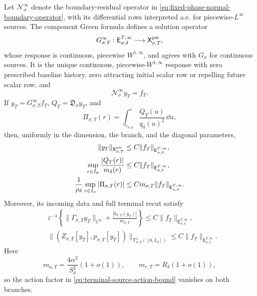 \begin{proposition}
Let \(\mathscr N_\sigma^\infty\) denote the boundary-residual operator in
\cref{eq:fixed-phase-normal-boundary-operator}, with its differential rows
interpreted a.e. for piecewise-\(L^\infty\) sources.  The component Green
formula defines a solution operator
\begin{equation}
 G_{\sigma,T}^{\infty}:
 \mathsf E_{\sigma,\delta}^{T,\infty}
 \longrightarrow\mathsf X_{\sigma,T}^{\rm pw},              \label{eq:terminal-source-green-extension}
\end{equation}
whose response is continuous, piecewise \(W^{1,\infty}\), and agrees with
\(G_\sigma\) for continuous sources.  It is the unique continuous,
piecewise-\(W^{1,\infty}\) response with zero prescribed baseline history,
zero attracting initial scalar row or repelling future scalar row, and
\begin{equation}
 \mathscr N_\sigma^\infty y_T=f_T.                         \label{eq:terminal-source-ae-normal-equation}
\end{equation}
If
\(
y_T=G_{\sigma,T}^{\infty}f_T
\),
\(
Q_T=\mathfrak D_\sigma y_T
\), and
\begin{equation}
 \Pi_{\sigma,T}(r)
 =\int_{e_{\sigma,0}}^r\frac{Q_T(u)}{q_0(u)^2}\,\dd u,       \label{eq:terminal-source-causal-primitive}
\end{equation}
then, uniformly in the dimension, the branch, and the diagonal parameters,
\begin{align}
 \|y_T\|_{\mathsf X_{\sigma,T}^{\rm pw}}
 &\le C\|f_T\|_{\mathsf E_{\sigma,\delta}^{T,\infty}},
                                                        \label{eq:terminal-source-state-bound}\\
 \sup_{r\in I_\sigma}\frac{|Q_T(r)|}{m_\delta(r)}
 &\le C\|f_T\|_{\mathsf E_{\sigma,\delta}^{T,\infty}},
                                                        \label{eq:terminal-source-speed-bound}\\
 \frac1{\rho_\delta}\sup_{r\in I_\sigma}|\Pi_{\sigma,T}(r)|
 &\le C m_{\sigma,T}
       \|f_T\|_{\mathsf E_{\sigma,\delta}^{T,\infty}}.     \label{eq:terminal-source-action-bound}
\end{align}
Moreover, its incoming data and full terminal recut satisfy
\begin{align}
 &\varepsilon^{-1}\left\{
   \|\Gamma_{\sigma,T}y_T\|_{C^0}
   +\frac{|b_{\sigma,T}(y_T)|}{m_{\sigma,T}}\right\}
 \le C\|f_T\|_{\mathsf E_{\sigma,\delta}^{T,\infty}},
                                                        \label{eq:terminal-source-interface-bound}\\
 &\|(Z_{\sigma,T}[y_T],p_{\sigma,T}[y_T])\|_
       {\mathsf T_{\sigma,T}^1([0,L_b])}
 \le C\|f_T\|_{\mathsf E_{\sigma,\delta}^{T,\infty}}.     \label{eq:terminal-source-trace-bound}
\end{align}
Here
\begin{equation}
 m_{a,T}=\frac{4\alpha^2}{S_\delta^2}(1+o(1)),
 \qquad
 m_{r,T}=R_\delta(1+o(1)),                       \label{eq:terminal-source-small-factors}
\end{equation}
so the action factor in \cref{eq:terminal-source-action-bound} vanishes on
both branches.


\end{proposition}
